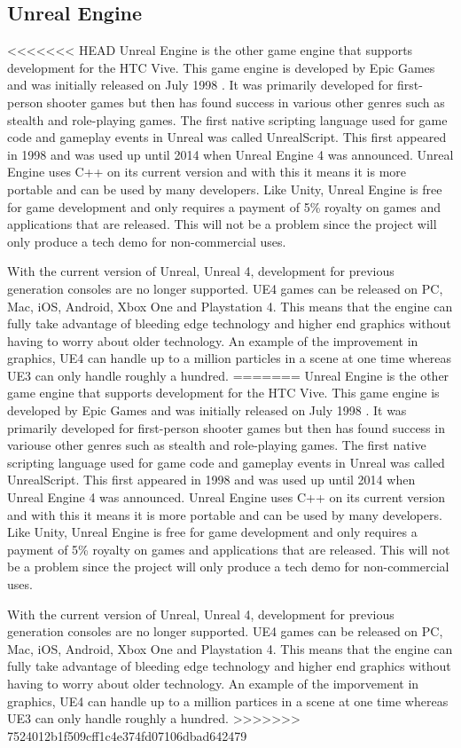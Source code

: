 \subsection{Unreal Engine}
<<<<<<< HEAD
Unreal Engine is the other game engine that supports development for the HTC Vive. This game engine is developed by Epic Games and was initially released on July 1998 \cite{unrealwiki}. It was primarily developed for first-person shooter games but then has found success in various other genres such as stealth and role-playing games. The first native scripting language used for game code and gameplay events in Unreal was called UnrealScript. This first appeared in 1998 and was used up until 2014 when Unreal Engine 4 was announced. Unreal Engine uses C++ on its current version and with this it means it is more portable and can be used by many developers. Like Unity, Unreal Engine is free for game development and only requires a payment of 5\% royalty on games and applications that are released\cite{whatisunreal}. This will not be a problem since the project will only produce a tech demo for non-commercial uses.
\newline
\par
With the current version of Unreal, Unreal 4, development for previous generation consoles are no longer supported. UE4 games can be released on PC, Mac, iOS, Android, Xbox One and Playstation 4\cite{unreal4nextgen}. This means that the engine can fully take advantage of bleeding edge technology and higher end graphics without having to worry about older technology. An example of the improvement in graphics, UE4 can handle up to a million particles in a scene at one time whereas UE3 can only handle roughly a hundred.
=======
Unreal Engine is the other game engine that supports development for the HTC Vive. This game engine is developed by Epic Games and was initially released on July 1998 \cite{unrealwiki}. It was primarily developed for first-person shooter games but then has found success in variouse other genres such as stealth and role-playing games. The first native scripting language used for game code and gameplay events in Unreal was called UnrealScript. This first appeared in 1998 and was used up until 2014 when Unreal Engine 4 was announced. Unreal Engine uses C++ on its current version and with this it means it is more portable and can be used by many developers. Like Unity, Unreal Engine is free for game development and only requires a payment of 5\% royalty on games and applications that are released\cite{whatisunreal}. This will not be a problem since the project will only produce a tech demo for non-commercial uses.
\newline
\par
With the current version of Unreal, Unreal 4, development for previous generation consoles are no longer supported. UE4 games can be released on PC, Mac, iOS, Android, Xbox One and Playstation 4\cite{unreal4nextgen}. This means that the engine can fully take advantage of bleeding edge technology and higher end graphics without having to worry about older technology. An example of the imporvement in graphics, UE4 can handle up to a million partices in a scene at one time whereas UE3 can only handle roughly a hundred.
>>>>>>> 7524012b1f509cff1c4e374fd07106dbad642479

